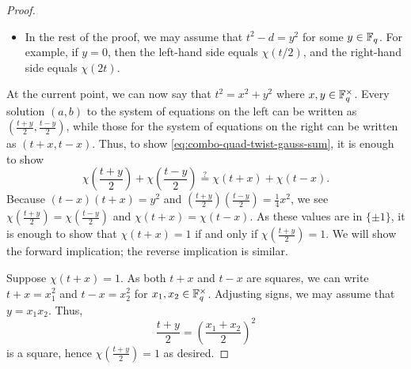 \begin{proof}
\begin{itemize}
        To continue, observe that solving the system of equations $a+b=t$ and $4ab=d$ is equivalent to having $a=t-b$ and
        \[(2b-t)^2=t^2-d.\]
        As such, for our next case, suppose that $t^2-d$ fails to be a square. Then the left-hand side of \eqref{eq:combo-quad-twist-gauss-sum} is empty and hence vanishes, so we want to show that the right-hand side also vanishes. But if $t^2-d=(t+x)(t-x)$ is non-square, then $\{\chi(t+x),\chi(t-x)\}=\{+1,-1\}$, so the summands on the right-hand side cancel out.
        \item In the rest of the proof, we may assume that $t^2-d=y^2$ for some $y\in\mathbb F_q$. For example, if $y=0$, then the left-hand side equals $\chi(t/2)$, and the right-hand side equals $\chi(2t)$.
    \end{itemize}
    At the current point, we can now say that $t^2=x^2+y^2$ where $x,y\in\mathbb F_q^\times$. Every solution $(a,b)$ to the system of equations on the left can be written as $\left(\frac{t+y}{2}, \frac{t-y}{2}\right)$, while those for the system of equations on the right can be written as $(t+x,t-x)$. Thus, to show \eqref{eq:combo-quad-twist-gauss-sum}, it is enough to show
    \begin{equation*}
        \chi\left(\frac{t+y}2\right)+\chi\left(\frac{t-y}2\right)\stackrel?=\chi(t+x)+\chi(t-x). \label{eq:last-combo-quad-twist-case}
    \end{equation*}
    Because $(t-x)(t+x)=y^2$ and $\left(\frac{t+y}2\right)\left(\frac{t-y}2\right)=\frac14x^2$, we see $\chi\left(\frac{t+y}2\right)=\chi\left(\frac{t-y}2\right)$ and $\chi(t+x)=\chi(t-x)$. As these values are in $\{\pm1\}$, it is enough to show that $\chi(t+x)=1$ if and only if $\chi\left(\frac{t+y}2\right)=1$. We will show the forward implication; the reverse implication is similar.

    Suppose $\chi(t+x) = 1$. As both $t+x$ and $t-x$ are squares, we can write $t+x=x_1^2$ and $t-x=x_2^2$ for $x_1,x_2\in\mathbb F_q^\times$. Adjusting signs, we may assume that $y=x_1x_2$. Thus,
    \[\frac{t+y}2=\left(\frac{x_1+x_2}2\right)^2\]
    is a square, hence $\chi\left(\frac{t+y}{2}\right) = 1$ as desired.
\end{proof}
